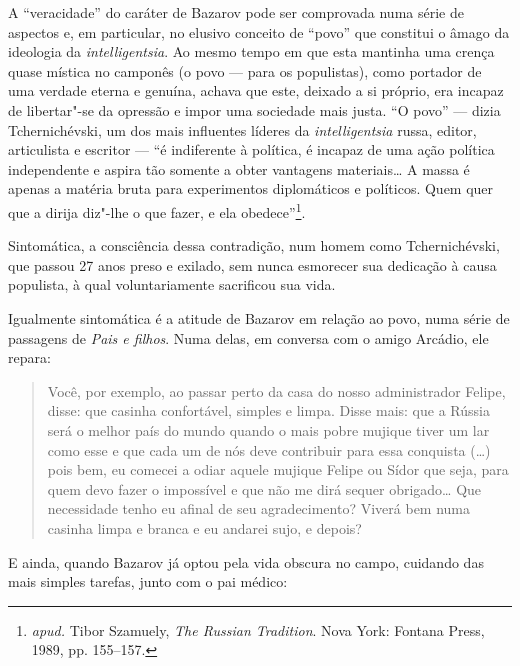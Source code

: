 A ``veracidade'' do caráter de Bazarov pode ser comprovada numa série de
aspectos e, em particular, no elusivo conceito de ``povo'' que constitui
o âmago da ideologia da \emph{intelligentsia}. Ao mesmo tempo em que esta
mantinha uma crença quase mística no camponês (o povo --- para os
populistas), como portador de uma verdade eterna e genuína, achava que
este, deixado a si próprio, era incapaz de libertar"-se da opressão e
impor uma sociedade mais justa. ``O povo'' --- dizia Tchernichévski, um dos
mais influentes líderes da \emph{intelligentsia} russa, editor,
articulista e escritor --- ``é indiferente à política, é incapaz de uma
ação política independente e aspira tão somente a obter vantagens
materiais\ldots{} A massa é apenas a matéria bruta para experimentos diplomáticos e
políticos. Quem quer que a dirija diz"-lhe o que fazer, e ela obedece''\footnote{\emph{apud.} Tibor Szamuely, \emph{The Russian Tradition}. Nova York: Fontana Press, 1989, pp. 155--157.}.

Sintomática, a consciência dessa contradição, num homem como
Tchernichévski, que passou 27 anos preso e exilado, sem nunca esmorecer
sua dedicação à causa populista, à qual voluntariamente sacrificou sua
vida.

Igualmente sintomática é a atitude de Bazarov em relação ao povo, numa
série de passagens de \emph{Pais e filhos}. Numa delas, em conversa com o amigo Arcádio, ele
repara:

\begin{quote}
Você, por exemplo, ao passar perto da casa do nosso administrador
Felipe, disse: que casinha confortável, simples e limpa. Disse mais: que
a Rússia será o melhor país do mundo quando o mais pobre mujique tiver
um lar como esse e que cada um de nós deve contribuir para essa
conquista (\ldots{}) pois bem, eu comecei a odiar aquele mujique Felipe ou
Sídor que seja, para quem devo fazer o impossível e que não me dirá
sequer obrigado\ldots{} Que necessidade tenho eu afinal de seu
agradecimento? Viverá bem numa casinha limpa e branca e eu andarei sujo,
e depois?
\end{quote}

E ainda, quando Bazarov já optou pela vida obscura no campo, cuidando
das mais simples tarefas, junto com o pai médico:

